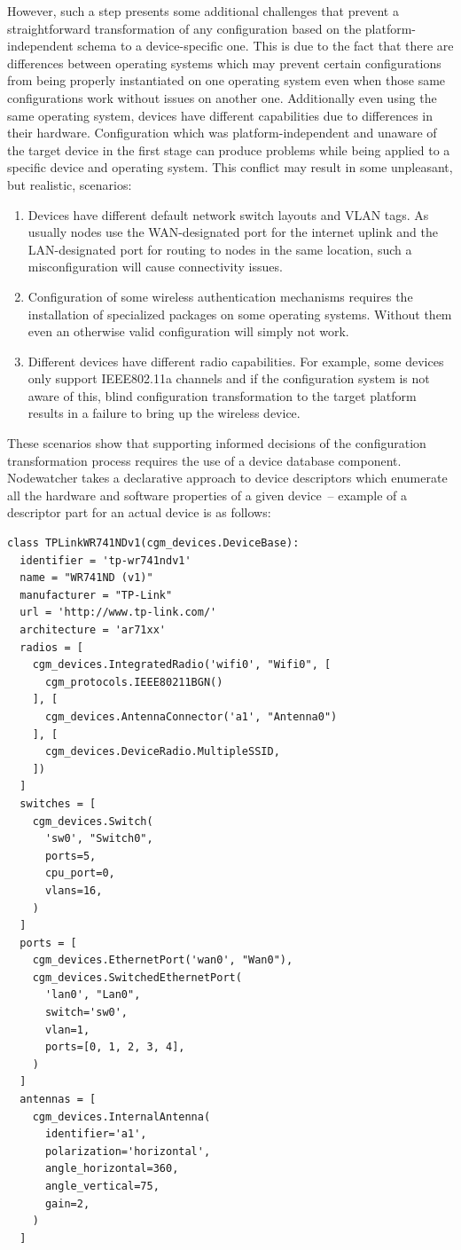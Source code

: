 \documentclass[5p,sort&compress]{elsarticle}
\begin{document}
However, such a step presents some additional challenges that prevent a straightforward transformation of any configuration based on the platform-independent schema to a device-specific one.
This is due to the fact that there are differences between operating systems which may prevent certain configurations from being properly instantiated on one operating system even when those same configurations work without issues on another one.
Additionally even using the same operating system, devices have different capabilities due to differences in their hardware.
Configuration which was platform-independent and unaware of the target device in the first stage can produce problems while being applied to a specific device and operating system.
This conflict may result in some unpleasant, but realistic, scenarios:
\begin{enumerate}[label=\roman*)]
\item Devices have different default network switch layouts and VLAN tags.
As usually nodes use the WAN-designated port for the internet uplink and the LAN-designated port for routing to nodes in the same location, such a misconfiguration will cause connectivity issues.

\item Configuration of some wireless authentication mechanisms requires the installation of specialized packages on some operating systems.
Without them even an otherwise valid configuration will simply not work.

\item Different devices have different radio capabilities.
For example, some devices only support IEEE802.11a channels and if the configuration system is not aware of this, blind configuration transformation to the target platform results in a failure to bring up the wireless device.
\end{enumerate}

These scenarios show that supporting informed decisions of the configuration transformation process requires the use of a device database component.
Nodewatcher takes a declarative approach to device descriptors which enumerate all the hardware and software properties of a given device~-- example of a descriptor part for an actual device is as follows:
\begin{verbatim}
class TPLinkWR741NDv1(cgm_devices.DeviceBase):
  identifier = 'tp-wr741ndv1'
  name = "WR741ND (v1)"
  manufacturer = "TP-Link"
  url = 'http://www.tp-link.com/'
  architecture = 'ar71xx'
  radios = [
    cgm_devices.IntegratedRadio('wifi0', "Wifi0", [
      cgm_protocols.IEEE80211BGN()
    ], [
      cgm_devices.AntennaConnector('a1', "Antenna0")
    ], [
      cgm_devices.DeviceRadio.MultipleSSID,
    ])
  ]
  switches = [
    cgm_devices.Switch(
      'sw0', "Switch0",
      ports=5,
      cpu_port=0,
      vlans=16,
    )
  ]
  ports = [
    cgm_devices.EthernetPort('wan0', "Wan0"),
    cgm_devices.SwitchedEthernetPort(
      'lan0', "Lan0",
      switch='sw0',
      vlan=1,
      ports=[0, 1, 2, 3, 4],
    )
  ]
  antennas = [
    cgm_devices.InternalAntenna(
      identifier='a1',
      polarization='horizontal',
      angle_horizontal=360,
      angle_vertical=75,
      gain=2,
    )
  ]
\end{verbatim}
\end{document}
